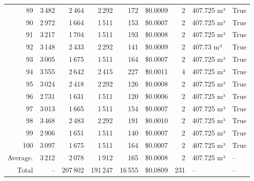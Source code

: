 \documentclass[a4paper,11pt]{article}
\begin{document}
\begin{table}[ht]
\begin{tabular}{r r r r r r r p{3cm} l}
89 & 3\,482 & 2\,464 & 2\,292 & 172 & \$0.0009 & 2 & 407.725 m³ & True \\
90 & 2\,972 & 1\,664 & 1\,511 & 153 & \$0.0007 & 2 & 407.725 m³ & True \\
91 & 3\,217 & 1\,704 & 1\,511 & 193 & \$0.0008 & 2 & 407.725 m³ & True \\
92 & 3\,148 & 2\,433 & 2\,292 & 141 & \$0.0009 & 2 & 407.73 m³ & True \\
93 & 3\,005 & 1\,675 & 1\,511 & 164 & \$0.0007 & 2 & 407.725 m³ & True \\
94 & 3\,555 & 2\,642 & 2\,415 & 227 & \$0.0011 & 4 & 407.725 m³ & True \\
95 & 3\,024 & 2\,418 & 2\,292 & 126 & \$0.0008 & 2 & 407.725 m³ & True \\
96 & 2\,731 & 1\,631 & 1\,511 & 120 & \$0.0006 & 2 & 407.725 m³ & True \\
97 & 3\,013 & 1\,665 & 1\,511 & 154 & \$0.0007 & 2 & 407.725 m³ & True \\
98 & 3\,468 & 2\,483 & 2\,292 & 191 & \$0.0010 & 2 & 407.725 m³ & True \\
99 & 2\,906 & 1\,651 & 1\,511 & 140 & \$0.0007 & 2 & 407.725 m³ & True \\
100 & 3\,097 & 1\,675 & 1\,511 & 164 & \$0.0007 & 2 & 407.725 m³ & True \\
\hline
Average. & 3\,212 & 2\,078 & 1\,912 & 165 & \$0.0008 & 2 & 407.725 m³ & -- \\
Total & -- & 207\,802 & 191\,247 & 16\,555 & \$0.0809 & 231 & -- & -- \\
\hline
\end{tabular}
\end{table}

\clearpage
\end{document}
